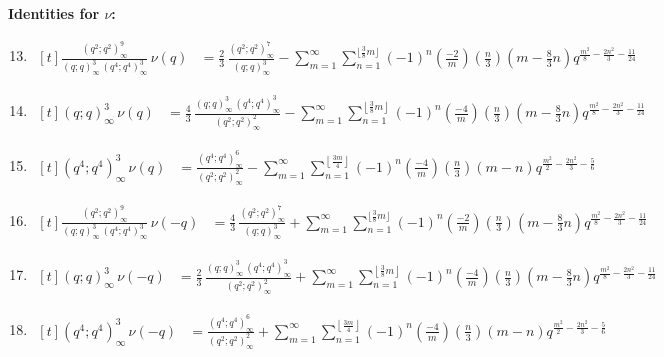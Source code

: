 \documentclass[11pt,reqno]{amsart}
\renewcommand{\=}{\;=\;}
\theoremstyle{myremark}
\begin{document}
\bigskip
\textbf{Identities for $\nu$:}
\begin{enumerate}[label=II.\arabic*.,ref=II.\arabic*, itemsep=1em]
\setcounter{enumi}{12}
\item \(\displaystyle
\begin{aligned}[t]
\frac{(q^2;q^2)_\infty^9}{(q;q)_\infty^3\,(q^4;q^4)_\infty^3}\,\nu(q)
&= \frac{2}{3}\,\frac{(q^2;q^2)_\infty^{7}}{(q;q)_\infty^3}
-\sum_{m=1}^\infty\sum_{n=1}^{\lfloor \frac{3}{8}m \rfloor}
(-1)^n \left(\frac{-2}{m}\right)\left(\frac{n}{3}\right)\left(m-\frac{8}{3}n\right)
q^{\frac{m^2}{8}-\frac{2n^2}{3}-\frac{11}{24}}
\end{aligned}\label{13}
\)
\item \(\displaystyle
\begin{aligned}[t]
(q;q)_\infty^3\,\nu(q)
&=
\frac{4}{3}\,
\frac{(q;q)_\infty^3\,(q^4;q^4)_\infty^3}
{(q^2;q^2)_\infty^2}
-\sum_{m=1}^\infty
\sum_{n=1}^{\left\lfloor \frac{3}{8}m \right\rfloor}
(-1)^n
\left(\frac{-4}{m}\right)
\left(\frac{n}{3}\right)
\left(m-\frac{8}{3}n\right)
q^{\frac{m^2}{8}-\frac{2n^2}{3}-\frac{11}{24}}
\end{aligned}\label{14}
\)
\item \(\displaystyle
\begin{aligned}[t]
(q^4;q^4)_\infty^3\,\nu(q)
&=
\frac{(q^4;q^4)_\infty^6}
{(q^2;q^2)_\infty^2}
-\sum_{m=1}^\infty
\sum_{n=1}^{\left\lfloor \frac{3m}{4} \right\rfloor}
(-1)^{n}
\left(\frac{-4}{m}\right)
\left(\frac{n}{3}\right)
(m-n)
q^{\frac{m^2}{2}-\frac{2n^2}{3}-\frac{5}{6}}
\end{aligned}\label{15}
\)
\item \(\displaystyle
\begin{aligned}[t]
\frac{(q^2;q^2)_\infty^9}{(q;q)_\infty^3\,(q^4;q^4)_\infty^3}\,\nu(-q)
&= \frac{4}{3}\,\frac{(q^2;q^2)_\infty^{7}}{(q;q)_\infty^3}
+\sum_{m=1}^\infty\sum_{n=1}^{\lfloor \frac{3}{8}m \rfloor}
(-1)^n \left(\frac{-2}{m}\right)\left(\frac{n}{3}\right)\left(m-\frac{8}{3}n\right)
q^{\frac{m^2}{8}-\frac{2n^2}{3}-\frac{11}{24}}
\end{aligned}\label{16}
\)
\item \(\displaystyle
\begin{aligned}[t]
(q;q)_\infty^3\,\nu(-q)
&= \frac{2}{3}\,\frac{(q;q)_\infty^3\,(q^4;q^4)_\infty^3}{(q^2;q^2)_\infty^2}
+\sum_{m=1}^\infty
\sum_{n=1}^{\left\lfloor \frac{3}{8}m \right\rfloor}
(-1)^n
\left(\frac{-4}{m}\right)
\left(\frac{n}{3}\right)
\left(m-\frac{8}{3}n\right)
q^{\frac{m^2}{8}-\frac{2n^2}{3}-\frac{11}{24}}
\end{aligned}\label{17}
\)
\item \(\displaystyle
\begin{aligned}[t]
(q^4;q^4)_\infty^3\,\nu(-q)
&= \frac{(q^4;q^4)_\infty^6}{(q^2;q^2)_\infty^2}
+\sum_{m=1}^\infty
\sum_{n=1}^{\left\lfloor \frac{3m}{4} \right\rfloor}
(-1)^{n}
\left(\frac{-4}{m}\right)
\left(\frac{n}{3}\right)
(m-n)
q^{\frac{m^2}{2}-\frac{2n^2}{3}-\frac{5}{6}}
\end{aligned}\label{18}
\)
\end{enumerate}
\end{document}
